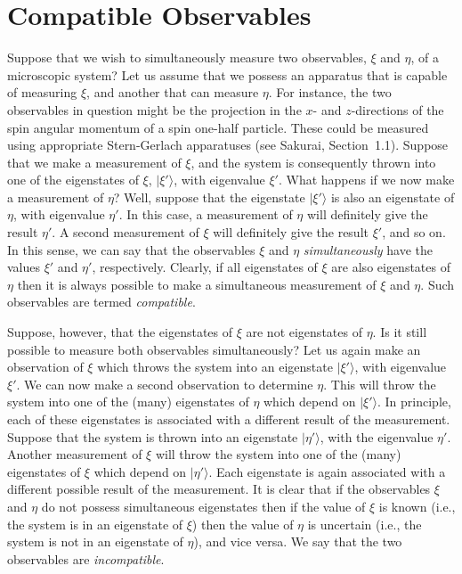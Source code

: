 \section{Compatible Observables}
Suppose that we wish to 
simultaneously measure two observables, $\xi$ and $\eta$, of a
microscopic system? Let us assume that we possess an apparatus that is
capable of measuring $\xi$, and another that  can measure $\eta$. For instance,
the two observables in question might be the projection in the
$x$- and $z$-directions of the
spin angular momentum  of a spin one-half particle. These could be measured using
appropriate Stern-Gerlach apparatuses (see Sakurai, Section~1.1). 
Suppose that we make a measurement of $\xi$, and the system is 
consequently thrown into
one of the eigenstates of $\xi$, $|\xi'\rangle$, with eigenvalue $\xi'$. What
happens if we now make a measurement of $\eta$?  Well, suppose that
the eigenstate $|\xi'\rangle$ is also an eigenstate of $\eta$, with eigenvalue
$\eta'$. In this case, a measurement of $\eta$ will definitely give the
result $\eta'$. A second measurement of $\xi$ will definitely give the
result $\xi'$, and so on. In this sense, we can say that
the observables $\xi$ and $\eta$
{\em simultaneously}\/ have the values $\xi'$ and $\eta'$, respectively. 
Clearly, if all eigenstates of $\xi$ are also eigenstates of $\eta$ then 
it is always possible to make a simultaneous measurement of $\xi$ and $\eta$.
Such observables are termed {\em compatible}. 

Suppose, however, that the eigenstates of $\xi$ are not eigenstates of $\eta$.
Is it still possible to measure both observables simultaneously? Let us again
make an observation of $\xi$ which throws the system into an eigenstate
$|\xi'\rangle$, with eigenvalue $\xi'$.
 We can now make a second observation to determine $\eta$. 
This will throw the system into one of the (many) eigenstates of $\eta$ which
 depend on $|\xi'\rangle$. In principle, each of these eigenstates is
associated with a different result of the measurement. Suppose that the
system is thrown into an eigenstate $|\eta'\rangle$, with the eigenvalue $\eta'$.
Another measurement of $\xi$ will throw the system into one of the (many)
eigenstates of $\xi$ which depend on $|\eta'\rangle$. 
Each eigenstate is again associated with a different possible
result of the measurement. It is clear that if the observables
$\xi$ and $\eta$ do not possess simultaneous eigenstates then if the value
of $\xi$ is known ({\rm i.e.}, the system is in an eigenstate of $\xi$)  then the
value of $\eta$ is uncertain ({\rm i.e.}, the system is not in an eigenstate
of $\eta$), and {\rm vice versa}. We say that the two observables are 
{\em incompatible}.

